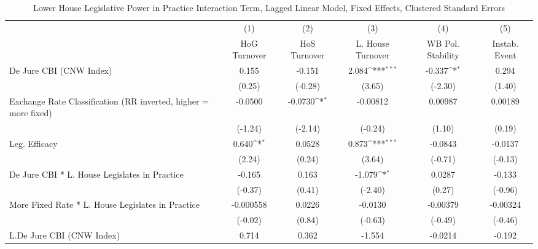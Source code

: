 {
\def\sym#1{\ifmmode^{#1}\else\(^{#1}\)\fi}
\begin{longtable}{l*{5}{c}}
\caption{Lower House Legislative Power in Practice Interaction Term, Lagged Linear Model, Fixed Effects, Clustered Standard Errors \label{llpintlagsDJ}}\\
\hline\hline\endfirsthead\hline\endhead\hline\endfoot\endlastfoot
                &\multicolumn{1}{c}{(1)}&\multicolumn{1}{c}{(2)}&\multicolumn{1}{c}{(3)}&\multicolumn{1}{c}{(4)}&\multicolumn{1}{c}{(5)}\\
                &\multicolumn{1}{c}{HoG Turnover}&\multicolumn{1}{c}{HoS Turnover}&\multicolumn{1}{c}{L. House Turnover}&\multicolumn{1}{c}{WB Pol. Stability}&\multicolumn{1}{c}{Instab. Event}\\
\hline
De Jure CBI (CNW Index)&    0.155         &   -0.151         &    2.084\sym{***}&   -0.337\sym{*}  &    0.294         \\
                &   (0.25)         &  (-0.28)         &   (3.65)         &  (-2.30)         &   (1.40)         \\
[1em]
Exchange Rate Classification (RR inverted, higher = more fixed)&  -0.0500         &  -0.0730\sym{*}  & -0.00812         &  0.00987         &  0.00189         \\
                &  (-1.24)         &  (-2.14)         &  (-0.24)         &   (1.10)         &   (0.19)         \\
[1em]
Leg. Efficacy   &    0.640\sym{*}  &   0.0528         &    0.873\sym{***}&  -0.0843         &  -0.0137         \\
                &   (2.24)         &   (0.24)         &   (3.64)         &  (-0.71)         &  (-0.13)         \\
[1em]
De Jure CBI * L. House Legislates in Practice&   -0.165         &    0.163         &   -1.079\sym{*}  &   0.0287         &   -0.133         \\
                &  (-0.37)         &   (0.41)         &  (-2.40)         &   (0.27)         &  (-0.96)         \\
[1em]
More Fixed Rate * L. House Legislates in Practice&-0.000558         &   0.0226         &  -0.0130         & -0.00379         & -0.00324         \\
                &  (-0.02)         &   (0.84)         &  (-0.63)         &  (-0.49)         &  (-0.46)         \\
[1em]
L.De Jure CBI (CNW Index)&    0.714         &    0.362         &   -1.554         &  -0.0214         &   -0.192         \\

\end{longtable}}
